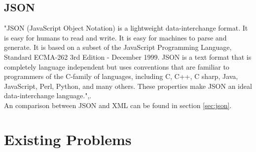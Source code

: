 \documentclass[12pt]{article}
\begin{document}
\subsection{JSON}
"JSON (JavaScript Object Notation) is a lightweight data-interchange format. It is easy for humans to read and write. It is easy for machines to parse and generate. It is based on a subset of the JavaScript Programming Language, Standard ECMA-262 3rd Edition - December 1999. JSON is a text format that is completely language independent but uses conventions that are familiar to programmers of the C-family of languages, including C, C++, C sharp, Java, JavaScript, Perl, Python, and many others. These properties make JSON an ideal data-interchange language.",\cite{json}.\\
An comparison between JSON and XML can be found in section \ref{sec:json}.
\section{Existing Problems}
\end{document}
